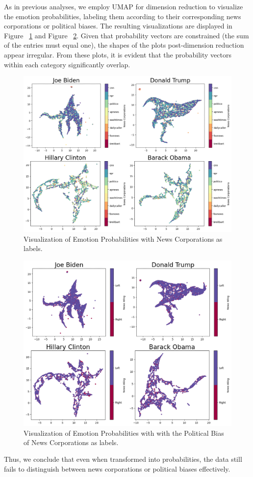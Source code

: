 \documentclass[sigconf]{acmart}
\begin{document}
As in previous analyses, we employ UMAP for dimension reduction to visualize the emotion probabilities, labeling them according to their corresponding news corporations or political biases. The resulting visualizations are displayed in Figure ~\ref{fig:emo_cors_prob} and Figure ~\ref{fig:emo_bias_prob}. Given that probability vectors are constrained (the sum of the entries must equal one), the shapes of the plots post-dimension reduction appear irregular. From these plots, it is evident that the probability vectors within each category significantly overlap. 


\begin{figure}
\centering
\includegraphics[width=.5\textwidth]{assets/emotion_cors_prob.png}
\caption{Visualization of Emotion Probabilities with News Corporations as labels.}
\label{fig:emo_cors_prob}
\vspace{10pt}
\end{figure}

\begin{figure}
\centering
\includegraphics[width=.5\textwidth]{assets/emotion_bias_prob.png}
\caption{Visualization of Emotion Probabilities with with the Political Bias of News Corporations as labels.}
\label{fig:emo_bias_prob}
\vspace{10pt}
\end{figure}

Thus, we conclude that even when transformed into probabilities, the data still fails to distinguish between news corporations or political biases effectively.
\end{document}

